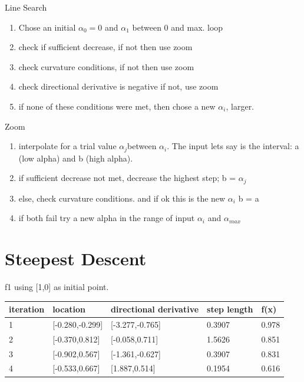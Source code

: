 \documentclass[7pt]{article}
\begin{document}
	Line Search
	\begin{enumerate}
	\item Chose an initial $\alpha_0 = 0$ and $\alpha_1$ between 0 and max. 
	loop 
		\item check if sufficient decrease, if not then use zoom 
		\item check curvature conditions, if not then use zoom
		\item check directional derivative is negative if not, use zoom
		\item if none of these conditions were met, then chose a new $\alpha_i$, larger. 
		
		\end{enumerate}
		
			Zoom
		\begin{enumerate}
		\item interpolate for a trial value $\alpha_j$between  $\alpha_i$. The input lets say is the interval: a (low alpha) and b (high alpha). 
		\item if sufficient decrease not met, decrease the highest step; b = $\alpha_j$
		\item else, check curvature conditions. and if ok this is the new $\alpha_i$  b = a 
		\item if both fail try a new alpha in the range of input $\alpha_i$ and $\alpha_{max}$
	\end{enumerate}
	
	\section{Steepest Descent}
	
	f1 using [1,0] as initial point. 
	\begin{center}
		\begin{tabular}{ | l | l | l | l | l |}
			\hline
			iteration & location & directional derivative & step length & f(x) \\ \hline
			 1& [-0.280,-0.299] & [-3.277,-0.765] & 0.3907 & 0.978\\ \hline
			 2& [-0.370,0.812] & [-0.058,0.711] & 1.5626 & 0.851\\ \hline
			 3& [-0.902,0.567]  & [-1.361,-0.627] & 0.3907 & 0.831\\ \hline
			 4& [-0.533,0.667] & [1.887,0.514] & 0.1954 & 0.616\\
			\hline
			\end{tabular}
			\end{center}
			
\end{document}
